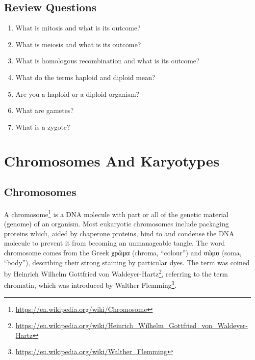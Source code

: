 \documentclass[]{book}
\providecommand{\tightlist}{%
  \setlength{\itemsep}{0pt}\setlength{\parskip}{0pt}}
\let\rmarkdownfootnote\footnote%
\def\footnote{\protect\rmarkdownfootnote}
\renewcommand{\href}[2]{#2\footnote{\url{#1}}}
\begin{document}
\hypertarget{review-questions-1}{%
\section{Review Questions}\label{review-questions-1}}

\begin{enumerate}
\def\labelenumi{\arabic{enumi}.}
\tightlist
\item
  What is mitosis and what is its outcome?
\item
  What is meiosis and what is its outcome?
\item
  What is homologous recombination and what is its outcome?
\item
  What do the terms haploid and diploid mean?
\item
  Are you a haploid or a diploid organism?
\item
  What are gametes?
\item
  What is a zygote?
\end{enumerate}

\hypertarget{chromosomes-and-karyotypes}{%
\chapter{Chromosomes And Karyotypes}\label{chromosomes-and-karyotypes}}

\hypertarget{chromosomes}{%
\section{Chromosomes}\label{chromosomes}}

A \href{https://en.wikipedia.org/wiki/Chromosome}{chromosome} is a DNA molecule with part or all of the genetic material (genome) of an organism. Most eukaryotic chromosomes include packaging proteins which, aided by chaperone proteins, bind to and condense the DNA molecule to prevent it from becoming an unmanageable tangle. The word chromosome comes from the Greek χρῶμα (chroma, ``colour'') and σῶμα (soma, ``body''), describing their strong staining by particular dyes. The term was coined by \href{https://en.wikipedia.org/wiki/Heinrich_Wilhelm_Gottfried_von_Waldeyer-Hartz}{Heinrich Wilhelm Gottfried von Waldeyer-Hartz}, referring to the term chromatin, which was introduced by \href{https://en.wikipedia.org/wiki/Walther_Flemming}{Walther Flemming}.
\end{document}
